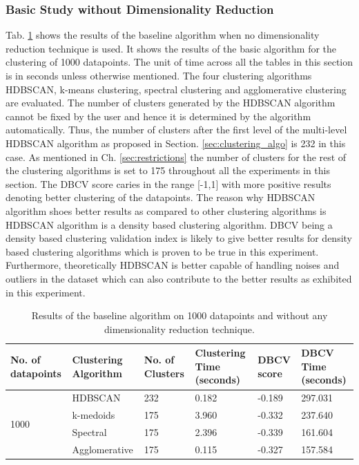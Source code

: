 \subsubsection{Basic Study without Dimensionality Reduction}
\label{sec:pointnet_dim}
Tab. \ref{tab:basic_without_tsne} shows the results of the baseline algorithm when no dimensionality reduction technique is used. It shows the results of the basic algorithm for the clustering of 1000 datapoints. The unit of time across all the tables in this section is in seconds unless otherwise mentioned. The four clustering algorithms \ac{HDBSCAN}, k-means clustering, spectral clustering and agglomerative clustering are evaluated. The number of clusters generated by the \ac{HDBSCAN} algorithm cannot be fixed by the user and hence it is determined by the algorithm automatically. Thus, the number of clusters after the first level of the multi-level \ac{HDBSCAN} algorithm as proposed in Section. \ref{sec:clustering_algo} is 232 in this case. As mentioned in Ch. \ref{sec:restrictions} the number of clusters for the rest of the clustering algorithms is set to 175 throughout all the experiments in this section. The \ac{DBCV} score caries in the range [-1,1] with more positive results denoting better clustering of the datapoints. The reason why \ac{HDBSCAN} algorithm shoes better results as compared to other clustering algorithms is \ac{HDBSCAN} algorithm is a density based clustering algorithm. \ac{DBCV} being a density based clustering validation index is likely to give better results for density based clustering algorithms which is proven to be true in this experiment. Furthermore, theoretically \ac{HDBSCAN} is better capable of handling noises and outliers in the dataset which can also contribute to the better results as exhibited in this experiment. 
\begin{table}[H]
    \setlength\extrarowheight{10pt}
    \caption{Results of the baseline algorithm on 1000 datapoints and without any dimensionality reduction technique. }
    \centering
    \begin{tabular}{|p{50pt}|p{60pt}|p{50pt}|p{40pt}|p{50pt}|p{40pt}|}
      \toprule
      No. of datapoints & Clustering Algorithm & No. of Clusters & Clustering Time (seconds) & \ac{DBCV} score & \ac{DBCV} Time (seconds)\\
      \midrule
      \multirow{4}{1.0in}{1000} & \ac{HDBSCAN} & 232 & 0.182 & -0.189 & 297.031 \\ \cline{2-6} 
                                & k-medoids & 175	& 3.960 & -0.332 & 237.640 \\ \cline{2-6} 
                                & Spectral & 175 & 2.396 & -0.339	& 161.604 \\ \cline{2-6}
                                & Agglomerative	& 175 & 0.115 & -0.327 & 157.584  \\ 
      \bottomrule
    \end{tabular}
    \label{tab:basic_without_tsne}
\end{table}

